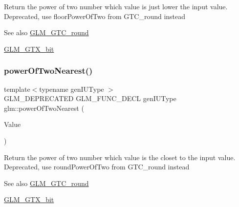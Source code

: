 Return the power of two number which value is just lower the input value. Deprecated, use floor\+Power\+Of\+Two from G\+T\+C\+\_\+round instead

\begin{DoxySeeAlso}{See also}
\hyperlink{group__gtc__round}{G\+L\+M\+\_\+\+G\+T\+C\+\_\+round} 

\hyperlink{group__gtx__bit}{G\+L\+M\+\_\+\+G\+T\+X\+\_\+bit} 
\end{DoxySeeAlso}
\mbox{\label{group__gtx__bit_ga5f65973a5d2ea38c719e6a663149ead9}} 
\subsubsection{\texorpdfstring{power\+Of\+Two\+Nearest()}{powerOfTwoNearest()}\hspace{0.1cm}{\footnotesize\ttfamily [1/2]}}
{\footnotesize\ttfamily template$<$typename gen\+I\+U\+Type $>$ \\
G\+L\+M\+\_\+\+D\+E\+P\+R\+E\+C\+A\+T\+ED G\+L\+M\+\_\+\+F\+U\+N\+C\+\_\+\+D\+E\+CL gen\+I\+U\+Type glm\+::power\+Of\+Two\+Nearest (\begin{DoxyParamCaption}\item[{gen\+I\+U\+Type}]{Value }\end{DoxyParamCaption})}

Return the power of two number which value is the closet to the input value. Deprecated, use round\+Power\+Of\+Two from G\+T\+C\+\_\+round instead

\begin{DoxySeeAlso}{See also}
\hyperlink{group__gtc__round}{G\+L\+M\+\_\+\+G\+T\+C\+\_\+round} 

\hyperlink{group__gtx__bit}{G\+L\+M\+\_\+\+G\+T\+X\+\_\+bit} 
\end{DoxySeeAlso}
\mbox{\label{group__gtx__bit_ga2d7e85995d097518b8d70cd409bda39e}} 
